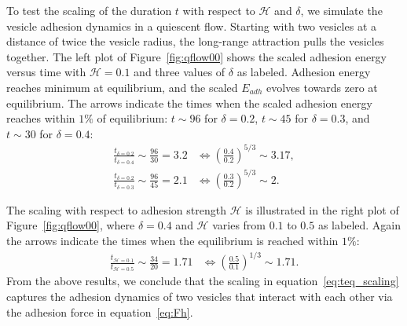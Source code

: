 \documentclass[prf,superscriptaddress,showkeys]{revtex4-1}
\begin{document}
To test the scaling of the duration $t$ with respect to $\mathcal{H}$
and $\delta$, we simulate the vesicle adhesion dynamics in a quiescent
flow.  Starting with two vesicles at a distance of twice the vesicle
radius, the long-range attraction pulls the vesicles together.  The left
plot of Figure~\ref{fig:qflow00} shows the scaled adhesion energy versus
time with $\mathcal{H}=0.1$ and three values of $\delta$ as labeled.
Adhesion energy reaches minimum at equilibrium, and the scaled $E_{adh}$
evolves towards zero at equilibrium.  The arrows indicate the times when
the scaled adhesion energy reaches within $1\%$ of equilibrium: $t\sim
96$ for $\delta=0.2$, $t\sim 45$ for $\delta = 0.3$, and $t\sim 30$ for
$\delta=0.4$:
\begin{align*}
\frac{t_{\delta=0.2}}{t_{\delta=0.4}} \sim \frac{96}{30}=3.2 
  &\Longleftrightarrow \left(\frac{0.4}{0.2}\right)^{5/3}\sim 3.17,\\
\frac{t_{\delta=0.2}}{t_{\delta=0.3}} \sim \frac{96}{45}=2.1 
  &\Longleftrightarrow \left(\frac{0.3}{0.2}\right)^{5/3}\sim 2.
\end{align*}

The scaling with respect to adhesion strength $\mathcal{H}$ is
illustrated in the right plot of Figure~\ref{fig:qflow00}, where $\delta
= 0.4$ and $\mathcal{H}$ varies from $0.1$ to $0.5$ as labeled.  Again
the arrows indicate the times when the equilibrium is reached within
$1\%$:
\begin{align*}
  \frac{t_{\mathcal{H}=0.1}}{t_{\mathcal{H}=0.5}} \sim \frac{34}{20} = 1.71 
  &\Longleftrightarrow \left(\frac{0.5}{0.1}\right)^{1/3}\sim 1.71.
\end{align*}
From the above results, we conclude that the scaling in
equation~\eqref{eq:teq_scaling} captures the adhesion dynamics of two
vesicles that interact with each other via the adhesion force in
equation~\eqref{eq:Fh}.

\end{document}

